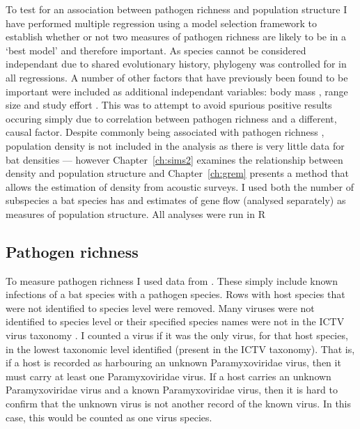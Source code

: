 To test for an association between pathogen richness and population structure I have performed multiple regression using a model selection framework to establish whether or not two measures of pathogen richness are likely to be in a `best model' and therefore important.
As species cannot be considered independant due to shared evolutionary history, phylogeny was controlled for in all regressions.
A number of other factors that have previously been found to be important were included as additional independant variables: body mass \cite{kamiya2014determines, turmelle2009correlates, gay2014parasite, maganga2014bat, han2015infectious}, range size \cite{kamiya2014determines, turmelle2009correlates, maganga2014bat} and study effort \cite{turmelle2009correlates, gay2014parasite, maganga2014bat}.
This was to attempt to avoid spurious positive results occuring simply due to correlation between pathogen richness and a different, causal factor.
Despite commonly being associated with pathogen richness \cite{arneberg2002host, kamiya2014determines, nunn2003comparative}, population density is not included in the analysis as there is very little data for bat densities --- however Chapter~\ref{ch:sims2} examines the relationship between density and population structure and Chapter~\ref{ch:grem} presents a method that allows the estimation of density from acoustic surveys.
I used both the number of subspecies a bat species has and estimates of gene flow (analysed separately) as measures of population structure.
All analyses were run in R \cite{R}

\subsection{Pathogen richness}

To measure pathogen richness I used data from \cite{luis2013comparison}. 
These simply include known infections of a bat species with a pathogen species. 
Rows with host species that were not identified to species level were removed.
Many viruses were not identified to species level or their specified species names were not in the ICTV virus taxonomy \cite{ICTV}.
I counted a virus if it was the only virus, for that host species, in the lowest taxonomic level identified (present in the ICTV taxonomy).
That is, if a host is recorded as harbouring an unknown Paramyxoviridae virus, then it must carry at least one Paramyxoviridae virus.
If a host carries an unknown Paramyxoviridae virus and a known Paramyxoviridae virus, then it is hard to confirm that the unknown virus is not another record of the known virus.
In this case, this would be counted as one virus species.






